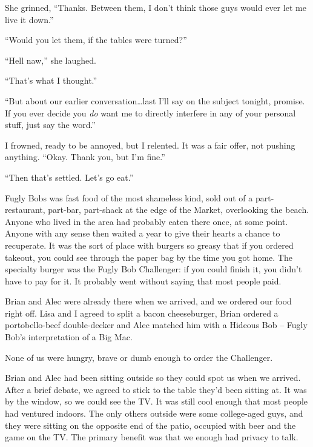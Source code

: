 She grinned, ``Thanks.  Between them, I don't think those guys would ever let me live it down.''



``Would you let them, if the tables were turned?''



``Hell naw,'' she laughed.



``That's what I thought.''



``But about our earlier conversation\ldots last I'll say on the subject tonight, promise.  If you ever decide you \emph{do} want me to directly interfere in any of your personal stuff, just say the word.''



I frowned, ready to be annoyed, but I relented.  It was a fair offer, not pushing anything.  ``Okay.  Thank you, but I'm fine.''



``Then that's settled.  Let's go eat.''



Fugly Bobs was fast food of the most shameless kind, sold out of a part-restaurant, part-bar, part-shack at the edge of the Market, overlooking the beach.  Anyone who lived in the area had probably eaten there once, at some point.  Anyone with any sense then waited a year to give their hearts a chance to recuperate.  It was the sort of place with burgers so greasy that if you ordered takeout, you could see through the paper bag by the time you got home.  The specialty burger was the Fugly Bob Challenger: if you could finish it, you didn't have to pay for it.  It probably went without saying that most people paid.



Brian and Alec were already there when we arrived, and we ordered our food right off.  Lisa and I agreed to split a bacon cheeseburger, Brian ordered a portobello-beef double-decker and Alec matched him with a Hideous Bob – Fugly Bob's interpretation of a Big Mac.



None of us were hungry, brave or dumb enough to order the Challenger.



Brian and Alec had been sitting outside so they could spot us when we arrived.  After a brief debate, we agreed to stick to the table they'd been sitting at.  It was by the window, so we could see the TV.  It was still cool enough that most people had ventured indoors.  The only others outside were some college-aged guys, and they were sitting on the opposite end of the patio, occupied with beer and the game on the TV.  The primary benefit was that we enough had privacy to talk.



